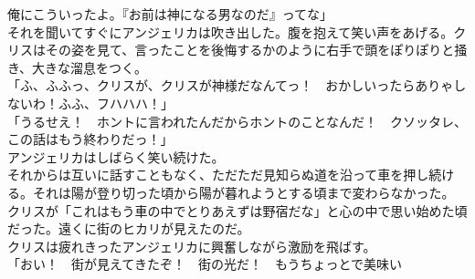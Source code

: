 \documentclass[b5j,10pt,openany]{jsbook}
\begin{document}
俺にこういったよ。『お前は神になる男なのだ』ってな」\\それを聞いてすぐにアンジェリカは吹き出した。腹を抱えて笑い声をあげる。クリスはその姿を見て、言ったことを後悔するかのように右手で頭をぽりぽりと掻き、大きな溜息をつく。\\「ふ、ふふっ、クリスが、クリスが神様だなんてっ！　おかしいったらありゃしないわ！ふふ、フハハハ！」\\「うるせえ！　ホントに言われたんだからホントのことなんだ！　クソッタレ、この話はもう終わりだっ！」\\アンジェリカはしばらく笑い続けた。\\それからは互いに話すこともなく、ただただ見知らぬ道を沿って車を押し続ける。それは陽が登り切った頃から陽が暮れようとする頃まで変わらなかった。\\クリスが「これはもう車の中でとりあえずは野宿だな」と心の中で思い始めた頃だった。遠くに街のヒカリが見えたのだ。\\クリスは疲れきったアンジェリカに興奮しながら激励を飛ばす。\\「おい！　街が見えてきたぞ！　街の光だ！　もうちょっとで美味い
\end{document}

